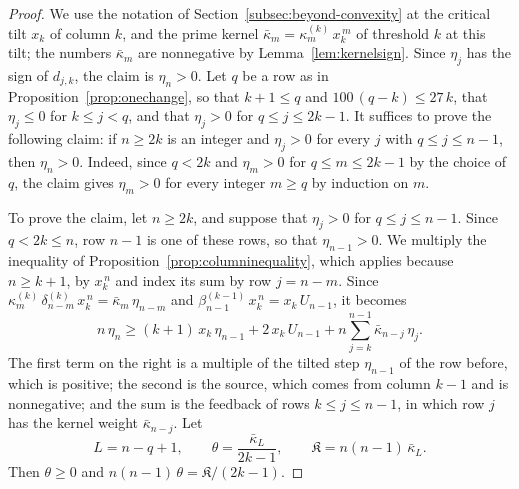 \documentclass{amsart}
\theoremstyle{definition}
\theoremstyle{remark}
\numberwithin{equation}{section}
\begin{document}
\begin{proof}
We use the notation of Section~\ref{subsec:beyond-convexity} at the critical
tilt $x_k$ of column $k$, and the prime kernel
$\bar\kappa_m=\kappa^{(k)}_m\,x_k^{\,m}$ of threshold $k$ at this tilt; the
numbers $\bar\kappa_m$ are nonnegative by Lemma~\ref{lem:kernelsign}. Since
$\eta_j$ has the sign of $d_{j,k}$, the claim is $\eta_n>0$. Let $q$ be a
row as in Proposition~\ref{prop:onechange}, so that $k+1\le q$ and
$100\,(q-k)\le27\,k$, that $\eta_j\le0$ for $k\le j<q$, and that $\eta_j>0$
for $q\le j\le2k-1$. It suffices to prove the following claim: if $n\ge2k$
is an integer and $\eta_j>0$ for every $j$ with $q\le j\le n-1$, then
$\eta_n>0$. Indeed, since $q<2k$ and $\eta_m>0$ for $q\le m\le2k-1$ by the
choice of $q$, the claim gives $\eta_m>0$ for every integer $m\ge q$ by
induction on $m$.

To prove the claim, let $n\ge2k$, and suppose that $\eta_j>0$ for
$q\le j\le n-1$. Since $q<2k\le n$, row $n-1$ is one of these rows, so
that $\eta_{n-1}>0$. We multiply the inequality of
Proposition~\ref{prop:columninequality}, which applies because $n\ge k+1$,
by $x_k^{\,n}$ and index its sum by row $j=n-m$. Since
$\kappa^{(k)}_m\,\delta^{(k)}_{n-m}\,x_k^{\,n}=\bar\kappa_m\,\eta_{n-m}$ and
$\beta^{(k-1)}_{n-1}\,x_k^{\,n}=x_k\,U_{n-1}$, it becomes
\begin{equation}\label{eq:beyond-column}
n\,\eta_n\ge(k+1)\,x_k\,\eta_{n-1}+2\,x_k\,U_{n-1}
+n\sum_{j=k}^{n-1}\bar\kappa_{n-j}\,\eta_j .
\end{equation}
The first term on the right is a multiple of the tilted step $\eta_{n-1}$
of the row before, which is positive; the second is the source, which comes
from column $k-1$ and is nonnegative; and the sum is the feedback of rows
$k\le j\le n-1$, in which row $j$ has the kernel weight
$\bar\kappa_{n-j}$. Let
\[
L=n-q+1,\qquad\theta=\frac{\bar\kappa_L}{2k-1},\qquad
\mathfrak K=n(n-1)\,\bar\kappa_L .
\]
Then $\theta\ge0$ and $n(n-1)\,\theta=\mathfrak K/(2k-1)$.


\end{proof}
\end{document}
